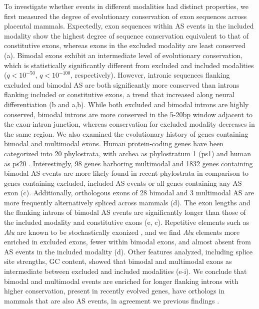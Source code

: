 To investigate whether events in different modalities had distinct properties, we first measured the degree of evolutionary conservation of exon sequences across placental mammals. Expectedly, exon sequences within AS events in the included modality show the highest degree of sequence conservation equivalent to that of constitutive exons, whereas exons in the excluded modality are least conserved (a). Bimodal exons exhibit an intermediate level of evolutionary conservation, which is statistically significantly different from excluded and included modalities ($q < 10^{-50}$, $q < 10^{-100}$, respectively). However, intronic sequences flanking excluded and bimodal AS are both significantly more conserved than introns flanking included or constitutive exons, a trend that increased along neural differentiation (b and a,b). While both excluded and bimodal introns are highly conserved, bimodal introns are more conserved in the 5-20bp window adjacent to the exon-intron junction, whereas conservation for excluded modality decreases in the same region. We also examined the evolutionary history of genes containing bimodal and multimodal exons. Human protein-coding genes have been categorized into 20 phylostrata, with archea as phylostratum 1 (ps1) and human as ps20 \cite{DomazetLoso:2008ba}. Interestingly, 98 genes harboring multimodal and 1832 genes containing bimodal AS events are more likely found in recent phylostrata in comparison to genes containing excluded, included AS events or all genes containing any AS exon (c). Additionally, orthologous exons of 28 bimodal and 3 multimodal AS are more frequently alternatively spliced across mammals (d). The exon lengths and the flanking introns of bimodal AS events are significantly longer than those of the included modality and constitutive exons (e, c). Repetitive elements such as \emph{Alu} are known to be stochastically exonized \cite{Stower:2013hq}, and we find \emph{Alu} elements more enriched in excluded exons, fewer within bimodal exons, and almost absent from AS events in the included modality (d). Other features analyzed, including splice site strengths, GC content, showed that bimodal and multimodal exons as intermediate between excluded and included modalities (e-i). We conclude that bimodal and multimodal events are enriched for longer flanking introns with higher conservation, present in recently evolved genes, have orthologs in mammals that are also AS events, in agreement we previous findings \cite{Yeo:2005ii}.


